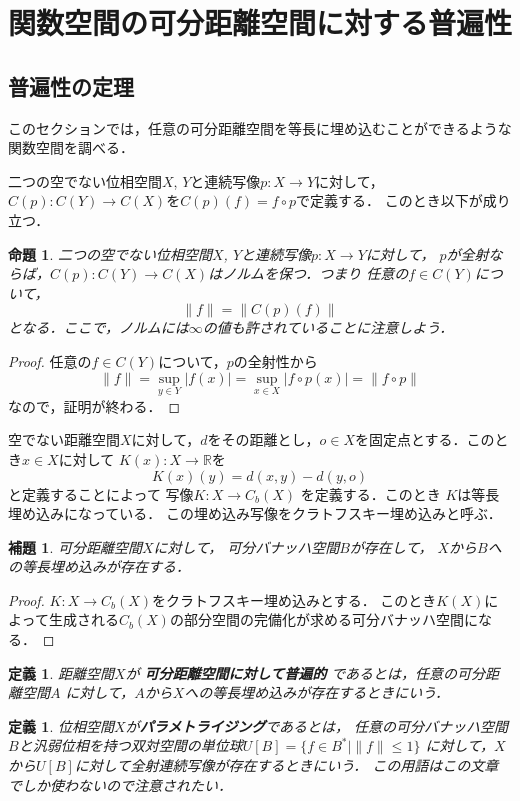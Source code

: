 \documentclass[leqno, a4paper, 12pt]{jsarticle}
\newtheorem{prop}[thm]{命題}
\newtheorem{lem}[thm]{補題}
\newtheorem{df}[thm]{定義}
\newcommand{\rr}{\mathbb{R}}
\begin{document}
\section{関数空間の可分距離空間に対する普遍性}
\subsection{普遍性の定理}
このセクションでは，任意の可分距離空間を等長に埋め込むことができるような関数空間を調べる．

二つの空でない位相空間$X$, $Y$と連続写像$p: X\to Y$に対して，
$C(p): C(Y)\to C(X)$を$C(p)(f)=f\circ p$で定義する．
このとき以下が成り立つ．
\begin{prop}\label{prop:hannpenn}
二つの空でない位相空間$X$, $Y$と連続写像$p: X\to Y$に対して，
$p$が全射ならば，$C(p): C(Y)\to C(X)$はノルムを保つ．つまり
任意の$f\in C(Y)$について，
\[
\|f\|=\|C(p)(f)\|
\]
となる．ここで，ノルムには$\infty$の値も許されていることに注意しよう．
\end{prop}
\begin{proof}
任意の$f\in C(Y)$について，$p$の全射性から
\[
\|f\|=\sup_{y\in Y}|f(x)|=\sup_{x\in X} |f\circ p(x)|=\|f\circ p\|
\]
なので，証明が終わる．
\end{proof}

空でない距離空間$X$に対して，$d$をその距離とし，$o\in X$を固定点とする．このとき$x\in X$に対して
$K(x): X\to \rr$を
\[
K(x)(y)=d(x, y)-d(y, o)
\]
と定義することによって
写像$K: X\to C_b(X)$
を定義する．このとき
$K$は等長埋め込みになっている．
この埋め込み写像をクラトフスキー埋め込みと呼ぶ．

\begin{lem}\label{cor:banach}
可分距離空間$X$に対して，
可分バナッハ空間$B$が存在して，
$X$から$B$への等長埋め込みが存在する．
\end{lem}
\begin{proof}
$K: X\to C_b(X)$をクラトフスキー埋め込みとする．
このとき$K(X)$によって生成される$C_b(X)$の部分空間の完備化が求める可分バナッハ空間になる．
\end{proof}

\begin{df}
距離空間$X$が
\textbf{可分距離空間に対して普遍的}
であるとは，任意の可分距離空間$A$
に対して，$A$から$X$への等長埋め込みが存在するときにいう．
\end{df}


\begin{df}
位相空間$X$が\textbf{パラメトライジング}であるとは，
任意の可分バナッハ空間$B$と汎弱位相を持つ双対空間の単位球$U[B]=\{f\in B^*\mid \|f\|\le 1\}$
に対して，$X$から$U[B]$に対して全射連続写像が存在するときにいう．
この用語はこの文章でしか使わないので注意されたい．
\end{df}
\end{document}
